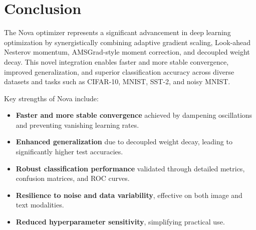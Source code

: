 \documentclass[10pt,twocolumn]{article}
\begin{document}
%
%
%


\section{Conclusion}\label{Sec 7}

The Nova optimizer represents a significant advancement in deep learning optimization by synergistically combining adaptive gradient scaling, Look-ahead Nesterov momentum, AMSGrad-style moment correction, and decoupled weight decay. This novel integration enables faster and more stable convergence, improved generalization, and superior classification accuracy across diverse datasets and tasks such as CIFAR-10, MNIST, SST-2, and noisy MNIST.

Key strengths of Nova include:
\begin{itemize}
    \item \textbf{Faster and more stable convergence} achieved by dampening oscillations and preventing vanishing learning rates.
    \item \textbf{Enhanced generalization} due to decoupled weight decay, leading to significantly higher test accuracies.
    \item \textbf{Robust classification performance} validated through detailed metrics, confusion matrices, and ROC curves.
    \item \textbf{Resilience to noise and data variability}, effective on both image and text modalities.
    \item \textbf{Reduced hyperparameter sensitivity}, simplifying practical use.
\end{itemize}
\end{document}
